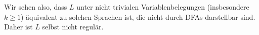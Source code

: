 \begin{enumerate}[a)]
Wir sehen also, dass $L$ unter nicht trivialen Variablenbelegungen (insbesondere $k \geq 1$) äquivalent zu solchen Sprachen ist, die nicht durch DFAs darstellbar sind. Daher ist $L$ selbst nicht regulär.


\end{enumerate}





















